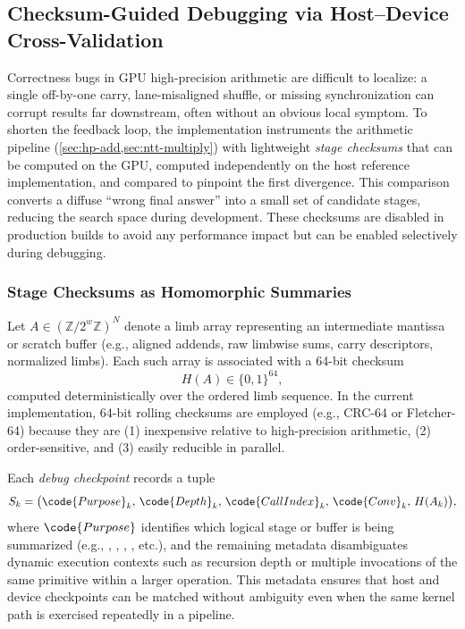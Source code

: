\subsection{Checksum-Guided Debugging via Host--Device Cross-Validation}
\label{sec:checksums}

Correctness bugs in GPU high-precision arithmetic are difficult to
localize: a single off-by-one carry, lane-misaligned shuffle, or missing
synchronization can corrupt results far downstream, often without an obvious
local symptom. To shorten the feedback loop, the implementation instruments the arithmetic
pipeline (\cref{sec:hp-add,sec:ntt-multiply}) with lightweight \emph{stage checksums} that can be computed on the GPU,
computed independently on the host reference implementation, and compared to
pinpoint the first divergence. This comparison converts a diffuse ``wrong final answer''
into a small set of candidate stages, reducing the search space
during development.  These checksums are disabled in production builds to avoid
any performance impact but can be enabled selectively during debugging.

\subsubsection{Stage Checksums as Homomorphic Summaries}

Let $A \in (\mathbb{Z}/2^w\mathbb{Z})^N$ denote a limb array representing an
intermediate mantissa or scratch buffer (e.g., aligned addends, raw limbwise
sums, carry descriptors, normalized limbs). Each such array is associated with a
64-bit checksum
\begin{equation}
  H(A) \in \{0,1\}^{64},
\end{equation}
computed deterministically over the ordered limb sequence. In the current implementation,
64-bit rolling checksums are employed (e.g., CRC-64 or Fletcher-64) because they are
(1) inexpensive relative to high-precision arithmetic, (2) order-sensitive, and
(3) easily reducible in parallel.

Each \emph{debug checkpoint} records a tuple
\begin{equation}
  S_k = \bigl(\code{Purpose}_k,\, \code{Depth}_k,\, \code{CallIndex}_k,\,
  \code{Conv}_k,\, H(A_k)\bigr),
\end{equation}
where $\code{Purpose}$ identifies which logical stage or buffer is being
summarized (e.g., , , ,
, etc.), and the remaining metadata disambiguates
dynamic execution contexts such as recursion depth or multiple invocations of
the same primitive within a larger operation. This metadata ensures that host
and device checkpoints can be matched without ambiguity even when the same
kernel path is exercised repeatedly in a pipeline.

